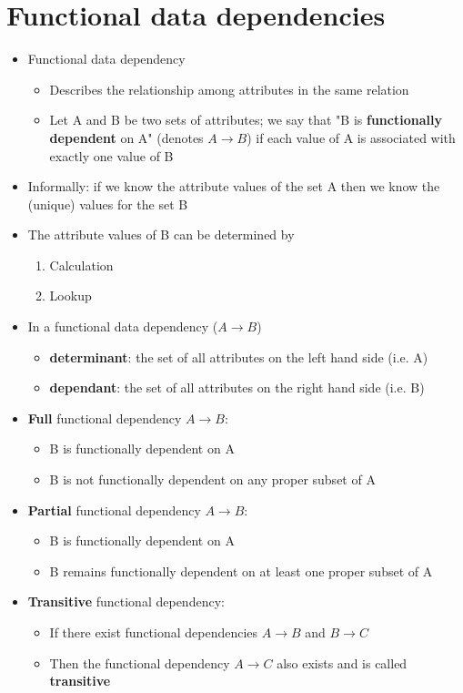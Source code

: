 \documentclass{article}[18pt]
\begin{document}
\section{Functional data dependencies}
\begin{itemize}
	\item Functional data dependency
	\begin{itemize}
		\item Describes the relationship among attributes in the same relation
		\item Let A and B be two sets of attributes; we say that "B is \textbf{functionally dependent} on A" (denotes $A\rightarrow B$) if each value of A is associated with exactly one value of B
	\end{itemize}
	\item Informally: if we know the attribute values of the set A then we know the (unique) values for the set B
	\item The attribute values of B can be determined by
	\begin{enumerate}
		\item Calculation
		\item Lookup
	\end{enumerate}
\end{itemize}
\begin{itemize}
	\item In a functional data dependency ($A\rightarrow B$)
	\begin{itemize}
		\item \textbf{determinant}: the set of all attributes on the left hand side (i.e. A)
		\item \textbf{dependant}: the set of all attributes on the right hand side (i.e. B)
	\end{itemize}
	\item \textbf{Full} functional dependency $A\rightarrow B$:
	\begin{itemize}
		\item B is functionally dependent on A
		\item B is not functionally dependent on any proper subset of A
	\end{itemize}
	\item \textbf{Partial} functional dependency $A\rightarrow B$:
	\begin{itemize}
		\item B is functionally dependent on A
		\item B remains functionally dependent on at least one proper subset of A
	\end{itemize}
	\item \textbf{Transitive} functional dependency:
	\begin{itemize}
		\item If there exist functional dependencies $A\rightarrow B$ and $B\rightarrow C$
		\item Then the functional dependency $A\rightarrow C$ also exists and is called \textbf{transitive}
	\end{itemize}
\end{itemize}
\end{document}
